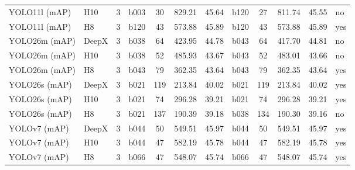 \begin{longtable}{l l r l S[table-format=4.0] S[table-format=4.2] S[table-format=2.2] l S[table-format=4.0] S[table-format=4.2] S[table-format=2.2] l}
YOLO11l (mAP) & H10 & 3 & b003 & 30 & 829.21 & 45.64 & b120 & 27 & 811.74 & 45.55 & no \\
YOLO11l (mAP) & H8 & 3 & b120 & 43 & 573.88 & 45.89 & b120 & 43 & 573.88 & 45.89 & yes \\
YOLO26m (mAP) & DeepX & 3 & b038 & 64 & 423.95 & 44.78 & b043 & 64 & 417.70 & 44.81 & no \\
YOLO26m (mAP) & H10 & 3 & b038 & 52 & 485.93 & 43.67 & b043 & 52 & 483.01 & 43.66 & no \\
YOLO26m (mAP) & H8 & 3 & b043 & 79 & 362.35 & 43.64 & b043 & 79 & 362.35 & 43.64 & yes \\
YOLO26s (mAP) & DeepX & 3 & b021 & 119 & 213.84 & 40.02 & b021 & 119 & 213.84 & 40.02 & yes \\
YOLO26s (mAP) & H10 & 3 & b021 & 74 & 296.28 & 39.21 & b021 & 74 & 296.28 & 39.21 & yes \\
YOLO26s (mAP) & H8 & 3 & b021 & 137 & 190.39 & 39.18 & b038 & 134 & 190.30 & 39.16 & no \\
YOLOv7 (mAP) & DeepX & 3 & b044 & 50 & 549.51 & 45.97 & b044 & 50 & 549.51 & 45.97 & yes \\
YOLOv7 (mAP) & H10 & 3 & b044 & 47 & 582.19 & 45.78 & b044 & 47 & 582.19 & 45.78 & yes \\
YOLOv7 (mAP) & H8 & 3 & b066 & 47 & 548.07 & 45.74 & b066 & 47 & 548.07 & 45.74 & yes \\
\bottomrule
\end{longtable}
\endgroup
